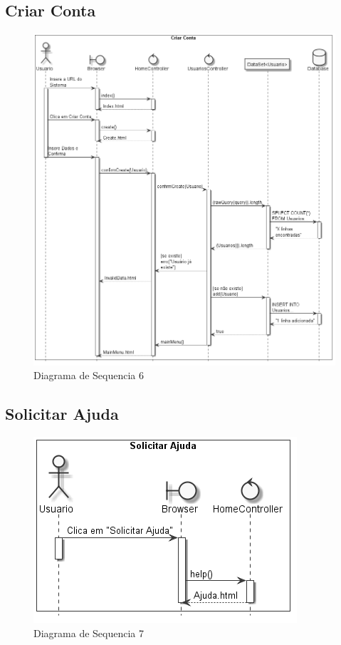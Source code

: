 \documentclass[rascunho,xindy,acronym,symbols]{fei}
\begin{document}
\subsection{Criar Conta}

\begin{figure}[H]
    \centering
    \includegraphics[width=\textwidth]{./Images/DS_Criar_Conta.jpg}
    \caption{Diagrama de Sequencia 6}
    \label{fig:diag_seq6}
\end{figure}

\subsection{Solicitar Ajuda}

\begin{figure}[H]
    \centering
    \includegraphics[width=\textwidth]{./Images/DS_Solicitar_Ajuda.jpg}
    \caption{Diagrama de Sequencia 7}
    \label{fig:diag_seq7}
\end{figure}
\end{document}

